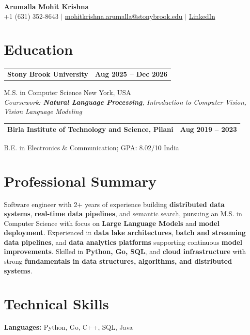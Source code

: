 \documentclass[letterpaper,10pt]{article}
\makeatletter
\newcommand{\entry}[2]{%
  \noindent
  \begin{tabularx}{\linewidth}
    {@{}>{\raggedright\arraybackslash}X@{\hspace{6pt}}r@{}}
    \textbf{#1} & #2
  \end{tabularx}\par
}
\makeatother
\begin{document}
\begin{center}
    {\LARGE\bfseries Arumalla Mohit Krishna}\\[3pt]
    +1 (631) 352-8643 $|$
    \href{mailto:mohitkrishna.arumalla@stonybrook.edu}
    {mohitkrishna.arumalla@stonybrook.edu} $|$
    \href{https://linkedin.com/in/mohit-krishna-arumalla}
    {LinkedIn}
\end{center}
\vspace{-8pt}

\section{Education}

\entry
  {\textbf{Stony Brook University}}
  {\textbf{Aug 2025 -- Dec 2026}}

M.S. in Computer Science \hfill New York, USA\\
\textit{
Coursework: \textbf{Natural Language Processing},
Introduction to Computer Vision, Vision Language Modeling
}
\vspace{3pt}

\entry
  {\textbf{Birla Institute of Technology and Science, Pilani}}
  {\textbf{Aug 2019 -- 2023}}

B.E. in Electronics \& Communication; GPA: 8.02/10 \hfill India
\section{Professional Summary}

Software engineer with 2+ years of experience building \textbf{distributed data systems}, \textbf{real-time data pipelines}, and semantic search, pursuing an M.S. in Computer Science with focus on \textbf{Large Language Models} and \textbf{model deployment}. Experienced in \textbf{data lake architectures}, \textbf{batch and streaming data pipelines}, and \textbf{data analytics platforms} supporting continuous \textbf{model improvements}. Skilled in \textbf{Python, Go, SQL}, and \textbf{cloud infrastructure} with strong \textbf{fundamentals in data structures, algorithms, and distributed systems}.

\section{Technical Skills}

\textbf{Languages:}
Python, Go, C++, SQL, Java\\
\end{document}
